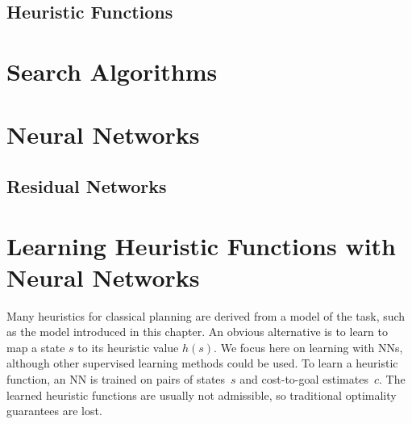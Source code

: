 \subsection{Heuristic Functions}
\label{sec:background_heuristicfunctions}


\section{Search Algorithms}
\label{sec:background_serchalgorithms}

\section{Neural Networks}
\label{sec:background_neuralnetworks}

\subsection{Residual Networks}
\label{sec:background_resnets}

\section{Learning Heuristic Functions with Neural Networks}
\label{sec:background_learningheuristics}

Many heuristics for classical planning are derived from a model of the task, such as the \sas model introduced in this chapter. An obvious alternative is to learn to map a state $s$ to its heuristic value $h(s)$. We focus here on learning with NNs, although other supervised learning methods could be used. To learn a heuristic function, an NN is trained on pairs of states~$s$ and cost-to-goal estimates~$c$. The learned heuristic functions are usually not admissible, so traditional optimality guarantees are lost.

